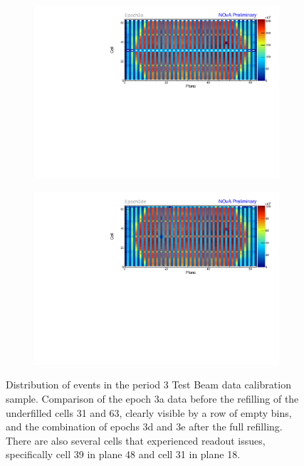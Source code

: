 \begin{figure}[!hbtp]
\centering
\begin{subfigure}[b]{\textwidth}
\centering
\includegraphics[width=\textwidth]{Plots/TBCalibration/Attenprofs_P3Data_CellPlane_Epoch3a.pdf}
\end{subfigure}
\begin{subfigure}[b]{\textwidth}
\centering
\includegraphics[width=\textwidth]{Plots/TBCalibration/Attenprofs_P3Data_CellPlane_Epoch3de.pdf}
\end{subfigure}
\caption[Plane-Cell distribution of hits for the period 3 data sample]{Distribution of events in the period 3 Test Beam data calibration sample. Comparison of the epoch 3a data before the refilling of the underfilled cells 31 and 63, clearly visible by a row of empty bins,  and the combination of epochs 3d and 3e after the full refilling. There are also several cells that experienced readout issues, specifically cell 39 in plane 48 and cell 31 in plane 18.}
\label{fig:CalibhistMap_period3}
\end{figure}

